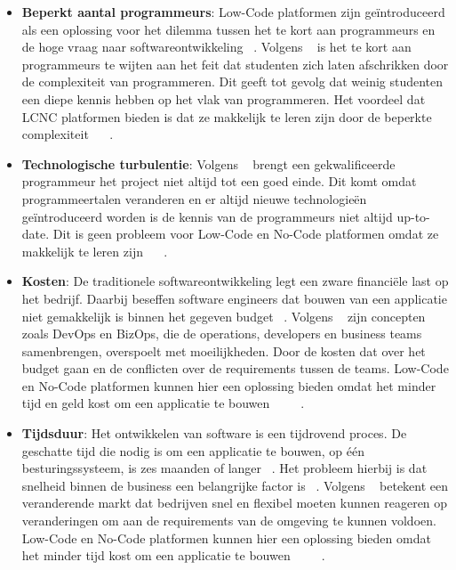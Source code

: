\begin{itemize}
    \item \textbf{Beperkt aantal programmeurs}: 
    Low-Code platformen zijn geïntroduceerd als een oplossing voor het dilemma tussen het te kort aan programmeurs en de hoge vraag naar softwareontwikkeling ~\autocite{ALSAADI_2021}. Volgens 
    ~\textcite{Moskal_2021} is het te kort aan programmeurs te wijten aan het feit dat studenten zich laten afschrikken door de complexiteit van programmeren. Dit geeft tot gevolg dat weinig 
    studenten een diepe kennis hebben op het vlak van programmeren. Het voordeel dat LCNC platformen bieden is dat ze makkelijk te leren zijn door de beperkte complexiteit ~\autocite{ALSAADI_2021} ~\autocite{Sufi_2023}.
    \item \textbf{Technologische turbulentie}:
    Volgens ~\textcite{Moskal_2021} brengt een gekwalificeerde programmeur het project niet altijd tot een goed einde.
    Dit komt omdat programmeertalen veranderen en er altijd nieuwe technologieën geïntroduceerd worden is de kennis van de programmeurs niet altijd up-to-date.
    Dit is geen probleem voor Low-Code en No-Code platformen omdat ze makkelijk te leren zijn ~\autocite{ALSAADI_2021} ~\autocite{Sufi_2023}.
    \item \textbf{Kosten}:
    De traditionele softwareontwikkeling legt een zware financiële last op het bedrijf. 
    Daarbij beseffen software engineers dat bouwen van een applicatie niet gemakkelijk is binnen het gegeven budget ~\autocite{Moskal_2021}. 
    Volgens ~\textcite{Elshan2023} zijn concepten zoals DevOps en BizOps, die de operations, developers en business teams samenbrengen, overspoelt met moeilijkheden. 
    Door de kosten dat over het budget gaan en de conflicten over de requirements tussen de teams.
    Low-Code en No-Code platformen kunnen hier een oplossing bieden omdat het minder tijd en geld kost om een applicatie te bouwen ~\autocite{Elshan2023} ~\autocite{Bock_2021} ~\autocite{Rokis_2023}.
    \item \textbf{Tijdsduur}:
    Het ontwikkelen van software is een tijdrovend proces. De geschatte tijd die nodig is om een applicatie te bouwen, op één besturingssysteem, is zes maanden of langer ~\autocite{Moskal_2021}. 
    Het probleem hierbij is dat snelheid binnen de business een belangrijke factor is ~\autocite{Sanchis_2019}. 
    Volgens ~\textcite{Sanchis_2019} betekent een veranderende markt dat bedrijven snel en flexibel moeten kunnen reageren op veranderingen om aan de requirements van de omgeving te kunnen voldoen.
    Low-Code en No-Code platformen kunnen hier een oplossing bieden omdat het minder tijd kost om een applicatie te bouwen ~\autocite{Adrian_2020} ~\autocite{Bock_2021} ~\autocite{Rokis_2023}.


\end{itemize}
